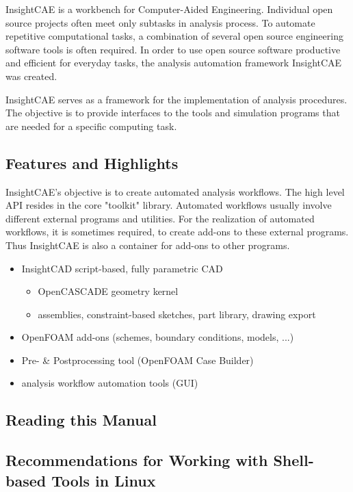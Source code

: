InsightCAE is a workbench for Computer-Aided Engineering. Individual open source projects often meet only subtasks in analysis process. To automate repetitive computational tasks, a combination of several open source engineering software tools is often required. In order to use open source software productive and efficient for everyday tasks, the analysis automation framework InsightCAE was created.

InsightCAE serves as a framework for the implementation of analysis procedures. The objective is to provide interfaces to the tools and simulation programs that are needed for a specific computing task.

\subsection{Features and Highlights}

InsightCAE's objective is to create automated analysis workflows.
The high level API resides in the core "toolkit" library.
Automated workflows usually involve different external programs and utilities.
For the realization of automated workflows, it is sometimes required, to create add-ons to these external programs.
Thus InsightCAE is also a container for add-ons to other programs.

\begin{itemize}
\item InsightCAD script-based, fully parametric CAD

\begin{itemize}
    \item OpenCASCADE geometry kernel
    \item assemblies, constraint-based sketches, part library, drawing export
\end{itemize}

\item OpenFOAM add-ons (schemes, boundary conditions, models, ...)
\item Pre- \& Postprocessing tool (OpenFOAM Case Builder)
\item analysis workflow automation tools (GUI)
\end{itemize}

\subsection{Reading this Manual}


\subsection{Recommendations for Working with Shell-based Tools in Linux}

